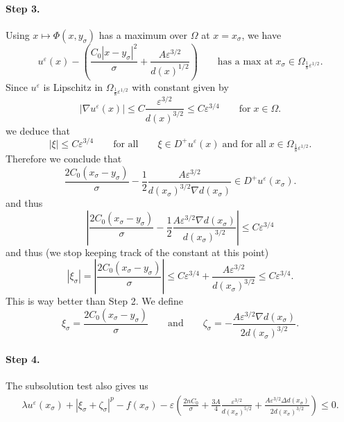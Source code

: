 \documentclass[11pt,reqno]{amsart}
\numberwithin{figure}{section}
\theoremstyle{plain}
\theoremstyle{remark}
\numberwithin{equation}{section}
\begin{document}
\paragraph{Step 3.} Using $x\mapsto \Phi(x,y_\sigma)$ has a maximum over $\Omega$ at $x=x_\sigma$, we have
\begin{equation*}
    u^\varepsilon(x) - \left(\frac{C_0|x-y_\sigma|^2}{\sigma}  + \frac{A\varepsilon^{3/2}}{d(x)^{1/2}}\right) \qquad\text{has a max at}\;x_\sigma \in \Omega_{\frac{1}{8}\varepsilon^{1/2}}.
\end{equation*}
Since $u^\varepsilon$ is Lipschitz in $\Omega_{\frac{1}{8}\varepsilon^{1/2}}$ with constant given by 
\begin{equation*}
|\nabla u^\varepsilon(x)|  \leq C\frac{\varepsilon^{3/2}}{d(x)^{3/2}} \leq C\varepsilon^{3/4} \qquad\text{for}\;x\in \Omega.
\end{equation*}
we deduce that 
\begin{equation*}
    |\xi|\leq C\varepsilon^{3/4} \qquad\text{for all}\qquad \xi\in D^+u^\varepsilon(x)\;\text{and for all}\; x\in \Omega_{\frac{1}{8}\varepsilon^{1/2}}.
\end{equation*}
Therefore we conclude that
\begin{equation*}
    \frac{2C_0(x_\sigma-y_\sigma)}{\sigma} -\frac{1}{2}\frac{A\varepsilon^{3/2}}{d(x_\sigma)^{3/2}\nabla d(x_\sigma)} \in D^+u^\varepsilon(x_\sigma).
\end{equation*}
and thus
\begin{equation*}
    \left|\frac{2C_0(x_\sigma-y_\sigma)}{\sigma} -\frac{1}{2}\frac{A\varepsilon^{3/2}\nabla d(x_\sigma)}{d(x_\sigma)^{3/2}}\right| \leq C\varepsilon^{3/4}
\end{equation*}
and thus (we stop keeping track of the constant at this point)
\begin{equation*}
    |\xi_\sigma| = \left|\frac{2C_0(x_\sigma - y_\sigma)}{\sigma}\right| \leq C\varepsilon^{3/4}  + \frac{A\varepsilon^{3/2}}{d(x_\sigma)^{3/2}} \leq C\varepsilon^{3/4}.
\end{equation*}
This is way better than Step 2. We define
\begin{equation*}
    \xi_\sigma = \frac{2C_0(x_\sigma - y_\sigma)}{\sigma} \qquad\text{and}\qquad \zeta_\sigma =-\frac{A\varepsilon^{3/2}\nabla d(x_\sigma)}{2d(x_\sigma)^{3/2}}.
\end{equation*}
\paragraph{Step 4.} The subsolution test also gives us
\begin{align}\label{e:subb1}
    \lambda u^\varepsilon(x_\sigma) + |\xi_\sigma+\zeta_\sigma|^p - f(x_\sigma) -  \varepsilon \left(\frac{2nC_0}{\sigma} + \frac{3A}{4}\frac{\varepsilon^{3/2}}{d(x_\sigma)^{5/2}} + \frac{A\varepsilon^{3/2}\Delta d(x_\sigma)}{2d(x_\sigma)^{3/2}}\right) \leq 0.
\end{align}
\end{document}
